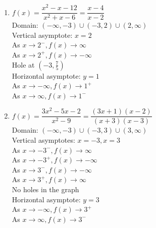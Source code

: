 \begin{multicols}{2}
\begin{enumerate}
\setcounter{enumi}{\value{HW}}

\item $f(x) = \dfrac{x^2-x-12}{x^{2} +x - 6} = \dfrac{x-4}{x - 2}$\\
Domain: $(-\infty, -3) \cup (-3, 2) \cup (2, \infty)$\\
Vertical asymptote: $x = 2$\\
As $x \rightarrow 2^{-}, f(x) \rightarrow \infty$\\
As $x \rightarrow 2^{+}, f(x) \rightarrow -\infty$\\
Hole at $\left(-3, \frac{7}{5} \right)$ \\
Horizontal asymptote: $y = 1$ \\
As $x \rightarrow -\infty, f(x) \rightarrow 1^{+}$\\
As $x \rightarrow \infty, f(x) \rightarrow 1^{-}$\\


\vfill

\columnbreak

\item $f(x) = \dfrac{3x^2-5x-2}{x^{2} -9} = \dfrac{(3x+1)(x-2)}{(x + 3)(x - 3)}$\\
Domain: $(-\infty, -3) \cup (-3, 3) \cup (3, \infty)$\\
Vertical asymptotes: $x = -3, x = 3$\\
As $x \rightarrow -3^{-}, f(x) \rightarrow \infty$\\
As $x \rightarrow -3^{+}, f(x) \rightarrow -\infty$\\
As $x \rightarrow 3^{-}, f(x) \rightarrow -\infty$\\
As $x \rightarrow 3^{+}, f(x) \rightarrow \infty$\\
No holes in the graph\\
Horizontal asymptote: $y = 3$ \\
As $x \rightarrow -\infty, f(x) \rightarrow 3^{+}$\\
As $x \rightarrow \infty, f(x) \rightarrow 3^{-}$\\

\setcounter{HW}{\value{enumi}}
\end{enumerate}
\end{multicols}

